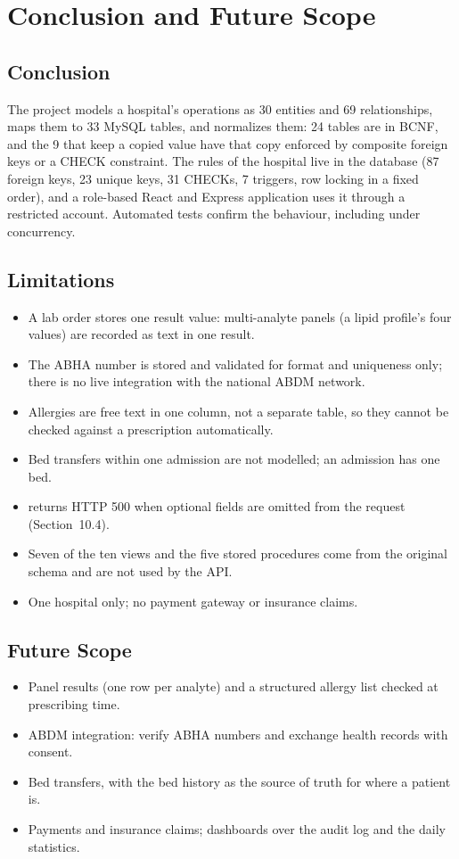\chapter{Conclusion and Future Scope}

\section{Conclusion}
The project models a hospital's operations as 30 entities and 69 relationships, maps them to 33 MySQL tables, and
normalizes them: 24 tables are in BCNF, and the 9 that keep a copied value have that copy enforced by composite
foreign keys or a CHECK constraint. The rules of the hospital live in the database (87 foreign keys, 23 unique keys,
31 CHECKs, 7 triggers, row locking in a fixed order), and a role-based React and Express application uses it through
a restricted account. Automated tests confirm the behaviour, including under concurrency.

\section{Limitations}
\begin{itemize}
\item A lab order stores one result value: multi-analyte panels (a lipid profile's four values) are recorded as text in one result.
\item The ABHA number is stored and validated for format and uniqueness only; there is no live integration with the national ABDM network.
\item Allergies are free text in one column, not a separate table, so they cannot be checked against a prescription automatically.
\item Bed transfers within one admission are not modelled; an admission has one bed.
\item {} returns HTTP 500 when optional fields are omitted from the request (Section~10.4).
\item Seven of the ten views and the five stored procedures come from the original schema and are not used by the API.
\item One hospital only; no payment gateway or insurance claims.
\end{itemize}

\section{Future Scope}
\begin{itemize}
\item Panel results (one row per analyte) and a structured allergy list checked at prescribing time.
\item ABDM integration: verify ABHA numbers and exchange health records with consent.
\item Bed transfers, with the bed history as the source of truth for where a patient is.
\item Payments and insurance claims; dashboards over the audit log and the daily statistics.
\end{itemize}
